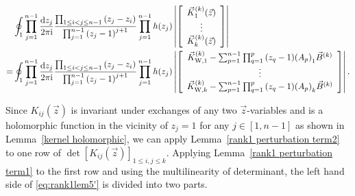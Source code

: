 \documentclass[cmp]{svjour}
\numberwithin{theorem}{section}
\numberwithin{equation}{section}
\def\dd{{\rm d}}
\def\ii{{\rm i}}
\begin{document}
\begin{equation}
\label{eq:rank1lem5'}
\begin{split}
& \oint_{1} \prod_{j=1}^{n-1}{ \frac{\dd z_j}{2 \pi \ii} } \frac{ \prod_{1 \leq i < j \leq n-1}{(z_j - z_i)} }{ \prod_{j=1}^{n-1}{{(z_j -1)}^{j+1}} } \prod_{j=1}^{n-1}{h(z_j)} 
\left|
\left[
\begin{array}{c}
\vec{K}^{(k)}_{1}(\vec{z}) \\
\vdots \\
\vec{K}^{(k)}_{k}(\vec{z}) 
\end{array}
\right]
\right| \\
= & \oint_{1} \prod_{j=1}^{n-1}{ \frac{\dd z_j}{2 \pi \ii} } \frac{ \prod_{1 \leq i < j \leq n-1}{(z_j - z_i)} }{ \prod_{j=1}^{n-1}{{(z_j -1)}^{j+1}} } \prod_{j=1}^{n-1}{h(z_j)} 
\left|
\left[ 
\begin{array}{c}
\vec{K}^{(k)}_{\mathrm{W}, 1} - \sum_{p=1}^{n-1}{ \prod_{q=1}^{p}{ (z_q - 1) {(A_p)}_1 } } \vec{B}^{(k)}  \\
\vdots \\
\vec{K}^{(k)}_{\mathrm{W}, k} - \sum_{p=1}^{n-1}{ \prod_{q=1}^{p}{ (z_q - 1) {(A_p)}_k } } \vec{B}^{(k)}  
\end{array}
\right]
\right| .
\end{split}
\end{equation}

Since $K_{ij}(\vec{z})$ is invariant under exchanges of any two $\vec{z}$-variables and is a holomorphic function in the vicinity of $z_j = 1 $ for any $j \in [1,n-1]$ as shown in Lemma~\ref{kernel holomorphic}, we can apply Lemma~\ref{rank1 perturbation term2} to one row of $\det[ K_{ij}(\vec{z}) ]_{1 \leq i , j \leq k}$.
Applying Lemma~\ref{rank1 perturbation term1} to the first row and using the multilinearity of determinant, the left hand side of \eqref{eq:rank1lem5'} is divided into two parts. 
\end{document}
